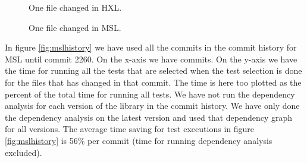 \documentclass{cslthse-msc}
\begin{document}
\begin{figure}
    \centering
    \caption{One file changed in HXL.}
    \label{fig:hxlonefile}
\end{figure}

\begin{figure}
    \centering
    \caption{One file changed in MSL.}
    \label{fig:mslonefile}
\end{figure}

In figure \ref{fig:mslhistory} we have used all the commits in the commit history for MSL until commit 2260. On the x-axis we have commits. On the y-axis we have the time for running all the tests that are selected when the test selection is done for the files that has changed in that commit. The time is here too plotted as the percent of the total time for running all tests. We have not run the dependency analysis for each version of the library in the commit history. We have only done the dependency analysis on the latest version and used that dependency graph for all versions. The average time saving for test executions in figure \ref{fig:mslhistory} is 56\% per commit (time for running dependency analysis excluded).
\end{document}
